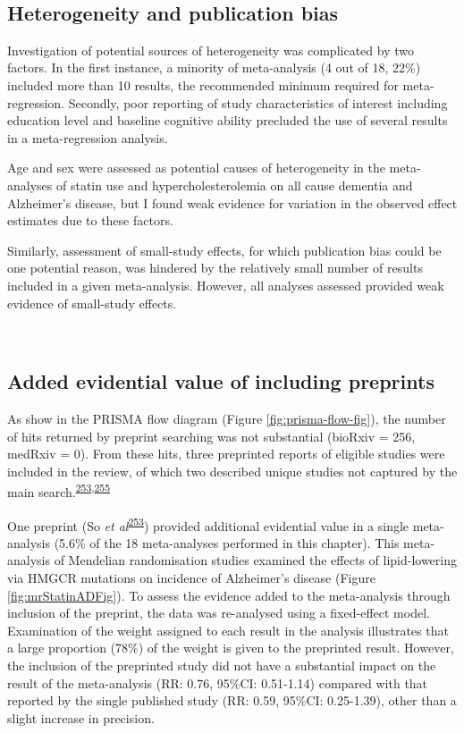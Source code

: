 \documentclass[a4paper, twoside]{templates/ociamthesis}
\begin{document}
~

\hypertarget{heterogeneity-and-publication-bias}{%
\subsection{Heterogeneity and publication bias}\label{heterogeneity-and-publication-bias}}

Investigation of potential sources of heterogeneity was complicated by two factors. In the first instance, a minority of meta-analysis (4 out of 18, 22\%) included more than 10 results, the recommended minimum required for meta-regression. Secondly, poor reporting of study characteristics of interest including education level and baseline cognitive ability precluded the use of several results in a meta-regression analysis.

Age and sex were assessed as potential causes of heterogeneity in the meta-analyses of statin use and hypercholesterolemia on all cause dementia and Alzheimer's disease, but I found weak evidence for variation in the observed effect estimates due to these factors.

Similarly, assessment of small-study effects, for which publication bias could be one potential reason, was hindered by the relatively small number of results included in a given meta-analysis. However, all analyses assessed provided weak evidence of small-study effects.

~

\hypertarget{sys-rev-including-preprints-res}{%
\subsection{Added evidential value of including preprints}\label{sys-rev-including-preprints-res}}

As show in the PRISMA flow diagram (Figure \ref{fig:prisma-flow-fig}), the number of hits returned by preprint searching was not substantial (bioRxiv = 256, medRxiv = 0). From these hits, three preprinted reports of eligible studies were included in the review, of which two described unique studies not captured by the main search.\textsuperscript{\protect\hyperlink{ref-so2017}{253},\protect\hyperlink{ref-andrews2019}{255}}

One preprint (So \emph{et al}\textsuperscript{\protect\hyperlink{ref-so2017}{253}}) provided additional evidential value in a single meta-analysis (5.6\% of the 18 meta-analyses performed in this chapter). This meta-analysis of Mendelian randomisation studies examined the effects of lipid-lowering via HMGCR mutations on incidence of Alzheimer's disease (Figure \ref{fig:mrStatinADFig}). To assess the evidence added to the meta-analysis through inclusion of the preprint, the data was re-analysed using a fixed-effect model. Examination of the weight assigned to each result in the analysis illustrates that a large proportion (78\%) of the weight is given to the preprinted result. However, the inclusion of the preprinted study did not have a substantial impact on the result of the meta-analysis (RR: 0.76, 95\%CI: 0.51-1.14) compared with that reported by the single published study (RR: 0.59, 95\%CI: 0.25-1.39), other than a slight increase in precision.
\end{document}

